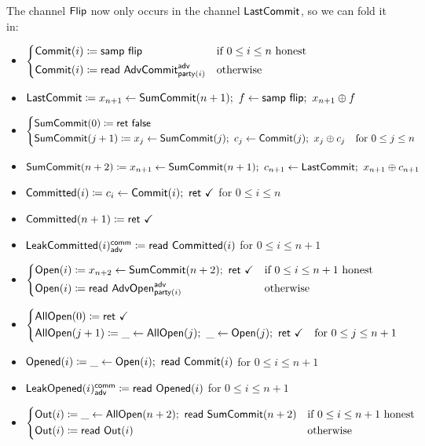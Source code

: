 \noindent The channel $\mathsf{Flip}$ now only occurs in the channel $\mathsf{LastCommit}$, so we can fold it in:

\begin{itemize}
\item {\color{blue} $\begin{cases*} \Commit(i) \coloneqq \samp{\flip} & \text{if $0 \leq i \leq n$ honest} \\ \Commit(i) \coloneqq \read{\AdvCommit^\adv_{\party(i)}} & \text{otherwise} \end{cases*}$}
\item {\color{blue} $\mathsf{LastCommit} \coloneqq x_{n+1} \leftarrow \mathsf{SumCommit}(n+1); \ f \leftarrow \mathsf{samp} \ \mathsf{flip}; \ x_{n+1} \oplus f$}
\item {\color{blue} $\begin{cases*} \SumCommit(0) \coloneqq \ret{\false} & \\ \SumCommit(j+1) \coloneqq x_j \leftarrow \SumCommit(j); \ c_j \leftarrow \Commit(j); \ x_j \oplus c_j & \text{for $0 \leq j \leq n$} \end{cases*}$}
\item {\color{blue} $\SumCommit(n+2) \coloneqq x_{n+1} \leftarrow \SumCommit(n+1); \ c_{n+1} \leftarrow \LastCommit; \ x_{n+1} \oplus c_{n+1}$}
\item {\color{magenta} $\mathsf{Committed}(i) \coloneqq c_i \leftarrow \mathsf{Commit}(i); \ \mathsf{ret} \ \checkmark$ for $0 \leq i \leq n$}
\item {\color{magenta} $\mathsf{Committed}(n+1) \coloneqq \mathsf{ret} \ \checkmark$}
\item {\color{magenta} $\mathsf{LeakCommitted}(i)^{\mathsf{comm}}_{\mathsf{adv}} \coloneqq \mathsf{read} \ \mathsf{Committed}(i)$ for $0 \leq i \leq n+1$}
\item {\color{teal} $\begin{cases*} \Open(i) \coloneqq x_{n+2} \leftarrow \SumCommit(n+2); \ \ret{\checkmark} & \text{if $0 \leq i \leq n+1$ honest} \\ \Open(i) \coloneqq \read{\AdvOpen^\adv_{\party(i)}} & \text{otherwise} \end{cases*}$}
\item {\color{teal} $\begin{cases*} \AllOpen(0) \coloneqq \ret{\checkmark} & \\ \AllOpen(j+1) \coloneqq \_ \leftarrow \AllOpen(j); \ \_ \leftarrow \Open(j); \ \ret{\checkmark} & \text{for $0 \leq j \leq n+1$} \end{cases*}$}
\item {\color{red} $\mathsf{Opened}(i) \coloneqq \_ \leftarrow \mathsf{Open}(i); \ \mathsf{read} \ \mathsf{Commit}(i)$ for $0 \leq i \leq n+1$}
\item {\color{red} $\mathsf{LeakOpened}(i)^{\mathsf{comm}}_{\mathsf{adv}} \coloneqq \mathsf{read} \ \mathsf{Opened}(i)$ for $0 \leq i \leq n+1$}
\item $\begin{cases*} \Out(i) \coloneqq \_ \leftarrow \AllOpen(n+2); \ \read{\SumCommit(n+2)} & \text{if $0 \leq i \leq n+1$ honest} \\ \Out(i) \coloneqq \read{\Out(i)} & \text{otherwise} \end{cases*}$
\end{itemize}

